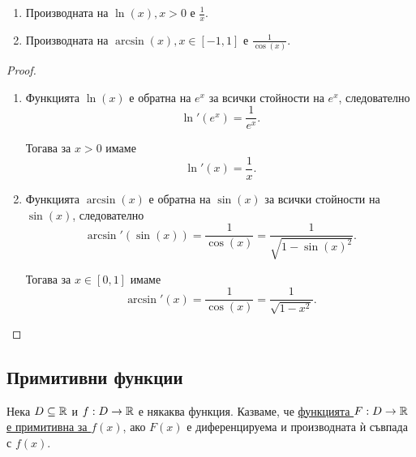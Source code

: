 \documentclass[numbers=endperiod, DIV=15, bibliography=totocnumbered]{scrartcl}
\begin{document}
\begin{theorem}
  \mbox{}
  \begin{enumerate}
    \item Производната на $\ln(x), x > 0$ е $\frac 1 x$.
    \item Производната на $\arcsin(x), x \in [-1, 1]$ е $\frac 1 {\cos(x)}$.
  \end{enumerate}
\end{theorem}
\begin{proof}
  \mbox{}
  \begin{enumerate}
    \item Функцията $\ln(x)$ е обратна на $e^x$ за всички стойности на $e^x$, следователно
    \begin{displaymath}
      \ln'(e^x) = \frac 1 {e^x}.
    \end{displaymath}

    Тогава за $x > 0$ имаме
    \begin{displaymath}
      \ln'(x) = \frac 1 {x}.
    \end{displaymath}

    \item Функцията $\arcsin(x)$ е обратна на $\sin(x)$ за всички стойности на $\sin(x)$, следователно
    \begin{displaymath}
      \arcsin'(\sin(x)) = \frac 1 {\cos(x)} = \frac 1 {\sqrt{1 - {\sin(x)}^2}}.
    \end{displaymath}

    Тогава за $x \in [0, 1]$ имаме
    \begin{displaymath}
      \arcsin'(x) = \frac 1 {\cos(x)} = \frac 1 {\sqrt{1 - x^2}}.
    \end{displaymath}
  \end{enumerate}
\end{proof}

\subsection{Примитивни функции}

\begin{definition}
  Нека $D \subseteq \mathbb{R}$ и $f: D \to \mathbb{R}$ е някаква функция. Казваме, че \uline{функцията $F: D \to \mathbb{R}$ е примитивна за $f(x)$}, ако $F(x)$ е диференцируема и производната ѝ съвпада с $f(x)$.
\end{definition}
\end{document}
